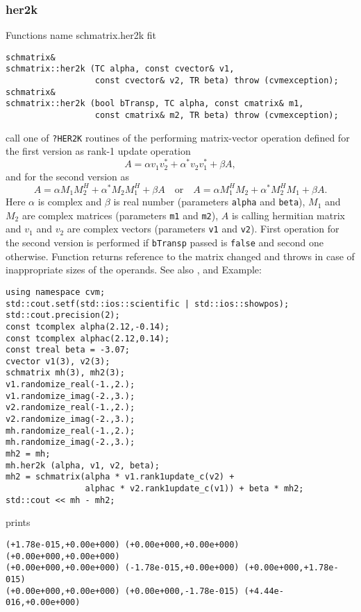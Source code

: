 \subsubsection{her2k}
Functions%
\pdfdest name {schmatrix.her2k} fit
\begin{verbatim}
schmatrix& 
schmatrix::her2k (TC alpha, const cvector& v1, 
                  const cvector& v2, TR beta) throw (cvmexception);
schmatrix& 
schmatrix::her2k (bool bTransp, TC alpha, const cmatrix& m1, 
                  const cmatrix& m2, TR beta) throw (cvmexception);
\end{verbatim}
call one of \verb"?HER2K" routines of the
performing  matrix-vector operation defined for the first version as
rank-1 update operation
\begin{equation*}
A=\alpha v_1 v_2^* + \alpha^* v_2 v_1^* + \beta A,
\end{equation*}
and for the second version as
\begin{equation*}
A=\alpha M_1 M_2^H + \alpha^* M_2 M_1^H + \beta A\quad
\text{or}\quad 
A=\alpha M_1^H M_2 + \alpha^* M_2^H M_1 + \beta A.
\end{equation*}
Here $\alpha$ is complex and $\beta$ is real number
(parameters \verb"alpha" and \verb"beta"),
$M_1$ and $M_2$ are complex matrices (parameters \verb"m1" and \verb"m2"),
$A$ is  calling hermitian matrix
and $v_1$ and $v_2$ are complex vectors (parameters \verb"v1" and \verb"v2").
First operation for the second version 
is performed if \verb"bTransp" passed
is \verb"false" and second one otherwise.
Function
returns  reference to the matrix changed and throws
in case of inappropriate sizes of the operands.
See also
,
 and 
Example:
\begin{Verbatim}
using namespace cvm;
std::cout.setf(std::ios::scientific | std::ios::showpos); 
std::cout.precision(2);
const tcomplex alpha(2.12,-0.14);
const tcomplex alphac(2.12,0.14);
const treal beta = -3.07;
cvector v1(3), v2(3);
schmatrix mh(3), mh2(3);
v1.randomize_real(-1.,2.);
v1.randomize_imag(-2.,3.);
v2.randomize_real(-1.,2.);
v2.randomize_imag(-2.,3.);
mh.randomize_real(-1.,2.);
mh.randomize_imag(-2.,3.);
mh2 = mh;
mh.her2k (alpha, v1, v2, beta);
mh2 = schmatrix(alpha * v1.rank1update_c(v2) + 
                alphac * v2.rank1update_c(v1)) + beta * mh2;
std::cout << mh - mh2;
\end{Verbatim}
prints
\begin{Verbatim}
(+1.78e-015,+0.00e+000) (+0.00e+000,+0.00e+000) (+0.00e+000,+0.00e+000)
(+0.00e+000,+0.00e+000) (-1.78e-015,+0.00e+000) (+0.00e+000,+1.78e-015)
(+0.00e+000,+0.00e+000) (+0.00e+000,-1.78e-015) (+4.44e-016,+0.00e+000)
\end{Verbatim}
